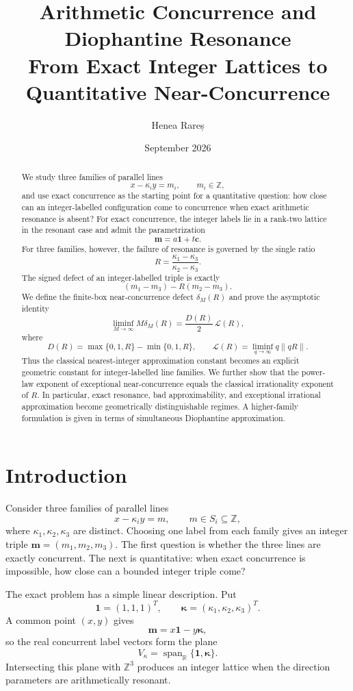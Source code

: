\documentclass[11pt,a4paper]{article}
\title{\textbf{Arithmetic Concurrence and Diophantine Resonance}\\
\large From Exact Integer Lattices to Quantitative Near-Concurrence}
\author{Henea Rareș}
\date{September 2026}
\begin{document}
\maketitle

\begin{abstract}
We study three families of parallel lines
\[
x-\kappa_i y=m_i,\qquad m_i\in\mathbb Z,
\]
and use exact concurrence as the starting point for a quantitative question: how close can an
integer-labelled configuration come to concurrence when exact arithmetic resonance is absent?
For exact concurrence, the integer labels lie in a rank-two lattice in the resonant case and admit
the parametrization
\[
\mathbf m=a\mathbf 1+t\mathbf c.
\]
For three families, however, the failure of resonance is governed by the single ratio
\[
R=\frac{\kappa_1-\kappa_3}{\kappa_2-\kappa_3}.
\]
The signed defect of an integer-labelled triple is exactly
\[
(m_1-m_3)-R(m_2-m_3).
\]
We define the finite-box near-concurrence defect $\delta_M(R)$ and prove the asymptotic identity
\[
\liminf_{M\to\infty}M\delta_M(R)=\frac{D(R)}2\,\mathcal L(R),
\]
where
\[
D(R)=\max\{0,1,R\}-\min\{0,1,R\},
\qquad
\mathcal L(R)=\liminf_{q\to\infty}q\|qR\|.
\]
Thus the classical nearest-integer approximation constant becomes an explicit geometric constant for
integer-labelled line families. We further show that the power-law exponent of exceptional
near-concurrence equals the classical irrationality exponent of $R$. In particular, exact
resonance, bad approximability, and exceptional irrational approximation become geometrically
distinguishable regimes. A higher-family formulation is given in terms of simultaneous
Diophantine approximation.
\end{abstract}

\tableofcontents

\section{Introduction}

Consider three families of parallel lines
\[
x-\kappa_i y=m,\qquad m\in S_i\subseteq\mathbb Z,
\]
where $\kappa_1,\kappa_2,\kappa_3$ are distinct. Choosing one label from each family gives an
integer triple $\mathbf m=(m_1,m_2,m_3)$. The first question is whether the three lines are exactly concurrent. The next is quantitative: when exact concurrence is impossible, how close can a bounded integer triple come?

The exact problem has a simple linear description. Put
\[
\mathbf 1=(1,1,1)^T,\qquad
\boldsymbol\kappa=(\kappa_1,\kappa_2,\kappa_3)^T.
\]
A common point $(x,y)$ gives
\[
\mathbf m=x\mathbf1-y\boldsymbol\kappa,
\]
so the real concurrent label vectors form the plane
\[
V_\kappa=\operatorname{span}_{\mathbb R}\{\mathbf1,\boldsymbol\kappa\}.
\]
Intersecting this plane with $\mathbb Z^3$ produces an integer lattice when the direction
parameters are arithmetically resonant.
\end{document}
